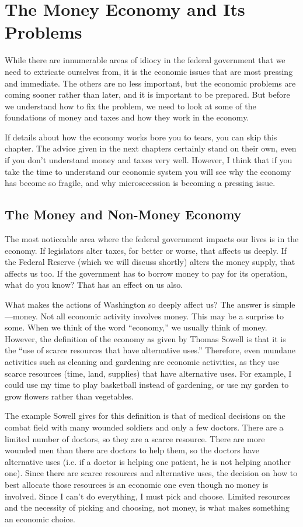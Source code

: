 \chapter{The Money Economy and Its Problems}

While there are innumerable areas of idiocy in the federal government
that we need to extricate ourselves from, it is the economic issues
that are most pressing
and immediate. The
others are no less important, but the economic problems are coming
sooner rather than later, and it is important to be prepared.  But
before we understand how to fix the problem, we need to look at some of
the foundations of money and taxes and how they work in the economy.

If details about how the economy works bore you to tears, you can
skip this chapter.  The advice given in the next chapters certainly
stand on their own, even if you don't understand money and taxes
very well.  However, I think that if you take the time to understand
our economic system you will see why the economy has become so fragile, and
why microsecession is becoming a pressing issue.

\section{The Money and Non-Money Economy}

The most noticeable area where the federal government impacts our lives
is in the economy. If legislators alter taxes, for better or worse,
that affects us deeply. If the Federal Reserve (which we will discuss
shortly) alters the money supply, that affects us too. If the
government has to borrow money to pay for its operation,
what do you know? That
has an effect on us also.

What makes the actions of Washington so deeply affect us?  The answer is
simple—money.  Not all economic activity involves money. This may be a
surprise to some. When we think of the word “economy,” we usually think
of money. However, the definition of the economy as given by Thomas
Sowell is that it is the “use of scarce resources that have alternative
uses.”  Therefore, even mundane activities such as cleaning and
gardening are economic
activities, as they
use scarce resources (time, land, supplies) that have alternative uses.
For example, I could
use my time to play basketball instead of gardening, or use my garden
to grow flowers rather than vegetables.  

The example Sowell gives for this definition
is that of medical decisions on the combat field with many wounded soldiers
and only a few doctors.  There are a limited
number of doctors, so they are a scarce resource.  There are more wounded
men than there are doctors to help them, so the doctors have alternative
uses (i.e. if a doctor is helping one patient, he is not helping another one).  
Since there are scarce resources and alternative uses, the decision
on how to best allocate those resources is an economic one even though
no money is involved.  Since I can't do everything, I must pick and choose.
Limited resources and the necessity of picking and choosing, not money, is what makes
something an economic choice.

